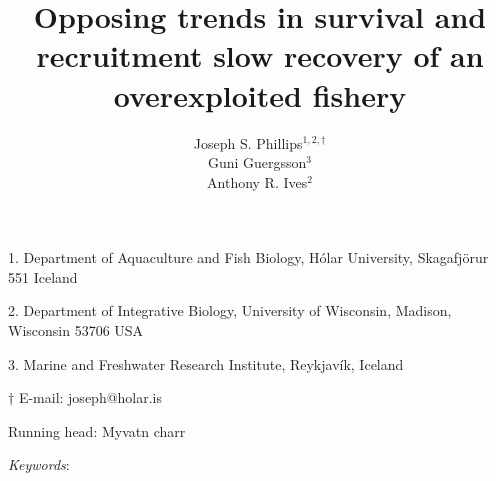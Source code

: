 \documentclass[11pt]{article}
\title{Opposing trends in survival and recruitment slow recovery of an overexploited fishery}
\author{
Joseph S. Phillips$^{1,2, \dagger}$ \\
Gu{\dh}ni Gu{\dh}ergsson$^{3}$ \\
Anthony R. Ives$^{2}$
}
\date{}
\begin{document}
\raggedright
\setlength\parindent{0.25in}

\maketitle


\noindent{} 1. Department of Aquaculture and Fish Biology, 
H\'{o}lar University, Skagafj\"{o}r{\dh}ur 551 Iceland

\noindent{} 2. Department of Integrative Biology, 
University of Wisconsin, Madison, Wisconsin 53706 USA

\noindent{} 3. Marine and Freshwater Research Institute, Reykjav\'{i}k, Iceland

\noindent{} $\dagger$ E-mail: joseph@holar.is



\bigskip

Running head: {Myvatn charr}

\linenumbers{}

\clearpage








\bigskip

\textit{Keywords}: {}

\clearpage
















\end{document}
